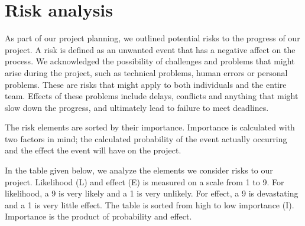 \newpage
\section{Risk analysis}

\label{sec:risk}
As part of our project planning, we outlined potential risks to the progress of our project. A risk is defined as an unwanted event that has a negative affect on the process. We acknowledged the possibility of challenges and problems that might arise during the project, such as technical problems, human errors or personal problems. These are risks that might apply to both individuals and the entire team. Effects of these problems include delays, conflicts and anything that might slow down the progress, and ultimately lead to failure to meet deadlines. 

The risk elements are sorted by their importance. Importance is calculated with two factors in mind; the calculated probability of the event actually occurring and the effect the event will have on the project. 

In the table given below, we analyze the elements we consider risks to our project. Likelihood (L) and effect (E) is measured on a scale from 1 to 9. For likelihood, a 9 is very likely and a 1 is very unlikely. For effect, a 9 is devastating and a 1 is very little effect. The table is sorted from high to low importance (I). Importance is the product of probability and effect. 

